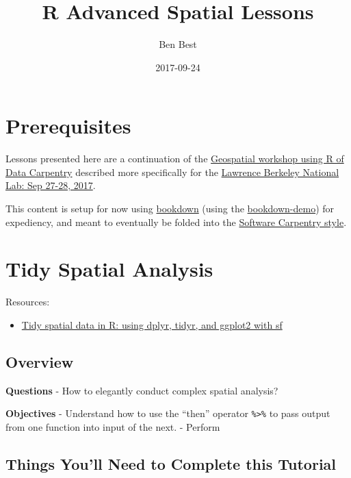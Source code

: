 \documentclass[]{book}
\title{R Advanced Spatial Lessons}
\author{Ben Best}
\date{2017-09-24}
\providecommand{\tightlist}{%
  \setlength{\itemsep}{0pt}\setlength{\parskip}{0pt}}
\theoremstyle{definition}
\theoremstyle{definition}
\theoremstyle{definition}
\theoremstyle{remark}
\begin{document}
\maketitle

{
\setcounter{tocdepth}{1}
\tableofcontents
}
\chapter*{Prerequisites}\label{prereq}

Lessons presented here are a continuation of the
\href{http://www.datacarpentry.org/lessons/\#geospatial-data-workshop}{Geospatial
workshop using R of Data Carpentry} described more specifically for the
\href{https://jsta.github.io/2017-09-27-LBNL/}{Lawrence Berkeley
National Lab: Sep 27-28, 2017}.

This content is setup for now using
\href{http://bookdown.org/yihui/bookdown}{bookdown} (using the
\href{https://github.com/rstudio/bookdown-demo}{bookdown-demo}) for
expediency, and meant to eventually be folded into the
\href{https://github.com/swcarpentry/styles}{Software Carpentry style}.

\chapter{Tidy Spatial Analysis}\label{tidy}

Resources:

\begin{itemize}
\tightlist
\item
  \href{http://strimas.com/r/tidy-sf/}{Tidy spatial data in R: using
  dplyr, tidyr, and ggplot2 with sf}
\end{itemize}

\section{Overview}\label{overview}

\textbf{Questions} - How to elegantly conduct complex spatial analysis?

\textbf{Objectives} - Understand how to use the ``then'' operator
\texttt{\%\textgreater{}\%} to pass output from one function into input
of the next. - Perform

\section{Things You'll Need to Complete this
Tutorial}\label{things-youll-need-to-complete-this-tutorial}
\end{document}
